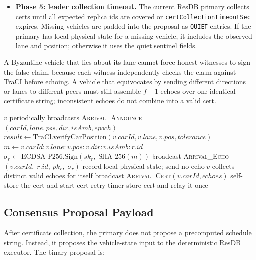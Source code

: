 \documentclass[fleqn,10pt]{olplainarticle}
\begin{document}
\begin{itemize}
    \item \textbf{Phase 5: leader collection timeout.} The current ResDB primary collects certs until all expected replica ids are covered or \texttt{certCollectionTimeoutSec} expires. Missing vehicles are padded into the proposal as \texttt{QUIET} entries. If the primary has local physical state for a missing vehicle, it includes the observed lane and position; otherwise it uses the quiet sentinel fields.
\end{itemize}

A Byzantine vehicle that lies about its lane cannot force honest witnesses to sign the false claim, because each witness independently checks the claim against TraCI before echoing. A vehicle that equivocates by sending different directions or lanes to different peers must still assemble $f+1$ echoes over one identical certificate string; inconsistent echoes do not combine into a valid cert.

\begin{algorithm}[H]
\caption{\textsc{ArrivalEchoDecide}$(v,\ replicas)$}
\begin{algorithmic}[1]
\State $v$ periodically broadcasts \textsc{Arrival\_Announce}$(carId, lane, pos, dir, isAmb, epoch)$
    \State $result \gets \text{TraCI.verifyCarPosition}(v.carId, v.lane, v.pos, tolerance)$
        \State $m \gets v.carId : v.lane : v.pos : v.dir : v.isAmb : r.id$
        \State $\sigma_r \gets \text{ECDSA-P256.Sign}(sk_r,\; \text{SHA-256}(m))$
        \State broadcast \textsc{Arrival\_Echo}$(v.carId,\; r.id,\; pk_r,\; \sigma_r)$
        \State record local physical state; send no echo
    \EndIf
\EndFor
\State $v$ collects distinct valid echoes for itself
    \State broadcast \textsc{Arrival\_Cert}$(v.carId, echoes)$
    \State self-store the cert and start cert retry timer
\EndIf
{}
    \State store cert and relay it once
\EndFor
\end{algorithmic}
\end{algorithm}

\subsection{Consensus Proposal Payload}
\label{subsec:consensus-payload}

After certificate collection, the primary does not propose a precomputed schedule string. Instead, it proposes the vehicle-state input to the deterministic ResDB executor. The binary proposal is:
\end{document}
